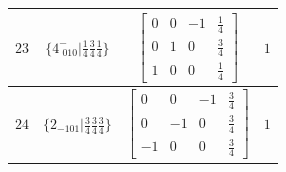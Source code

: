 \documentclass[fleqn,8pt]{jsarticle}
\begin{document}
\begin{longtable}{cccc}
$ 23 $ & $ \{4^{-}_{\,\,010}|\frac{1}{4} \frac{3}{4} \frac{1}{4}\} $ & $ \begin{bmatrix} 0 & 0 & -1 & \frac{1}{4} \\ 0 & 1 & 0 & \frac{3}{4} \\ 1 & 0 & 0 & \frac{1}{4} \end{bmatrix} $ & $ 1 $ \\ \hline
$ 24 $ & $ \{2{}_{-101}|\frac{3}{4} \frac{3}{4} \frac{3}{4}\} $ & $ \begin{bmatrix} 0 & 0 & -1 & \frac{3}{4} \\ 0 & -1 & 0 & \frac{3}{4} \\ -1 & 0 & 0 & \frac{3}{4} \end{bmatrix} $ & $ 1 $ \\
\end{longtable}
\end{document}
